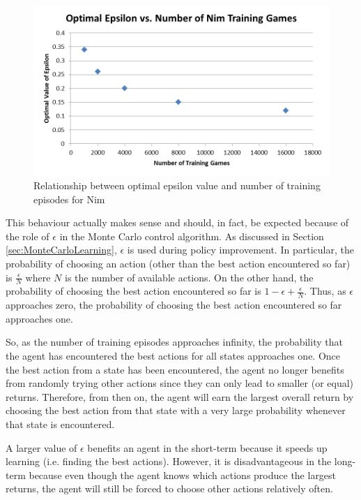 \documentclass[11pt,a4paper]{report}
\begin{document}
\begin{figure}[htbp]
	\begin{center}
		\includegraphics[width=125mm]{Nim_OptimalEpsilon_vs_Training.png}
		\caption{Relationship between optimal epsilon value and number of training episodes for Nim}
		\label{nim-training-vs-opt-epsilon}
	\end{center}
\end{figure}

This behaviour actually makes sense and should, in fact, be expected because of the role of $\epsilon$ in the Monte Carlo control algorithm. As discussed in Section \ref{sec:MonteCarloLearning}, $\epsilon$ is used during policy improvement. In particular, the probability of choosing an action (other than the best action encountered so far) is $\frac{\epsilon}{N}$ where $N$ is the number of available actions. On the other hand, the probability of choosing the best action encountered so far is  $1 - \epsilon + \frac{\epsilon}{N}$. Thus, as $\epsilon$ approaches zero, the probability of choosing the best action encountered so far approaches one.

So, as the number of training episodes approaches infinity, the probability that the agent has encountered the best actions for all states approaches one. Once the best action from a state has been encountered, the agent no longer benefits from randomly trying other actions since they can only lead to smaller (or equal) returns. Therefore, from then on, the agent will earn the largest overall return by choosing the best action from that state with a very large probability whenever that state is encountered.

A larger value of $\epsilon$ benefits an agent in the short-term because it speeds up learning (i.e. finding the best actions). However, it is disadvantageous in the long-term because even though the agent knows which actions produce the largest returns, the agent will still be forced to choose other actions relatively often.
\end{document}

